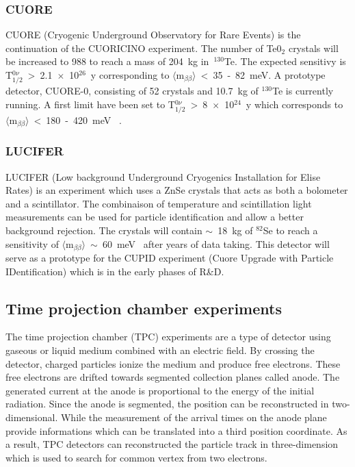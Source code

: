 \documentclass[main.tex]{subfiles}
\begin{document}
\subsubsection{CUORE}


\NI CUORE (Cryogenic Underground Observatory for Rare Events) is the continuation of the CUORICINO experiment. The number of Te0$_\text{2}$ crystals will be increased to 988 to reach a mass of 204~kg in~$^{\text{130}}$Te. The expected sensitivy is T$_{\text{1/2}}^{0\nu}$~>~2.1~$\times$~10$^{\text{26}}$~y corresponding to $\langle \text{m}_{\beta\beta} \rangle$~<~35~-~82~meV. A prototype detector, CUORE-0, consisting of 52 crystals and 10.7~kg of $^{\text{130}}$Te is currently running. A first limit have been set to T$_{\text{1/2}}^{0\nu}$~>~8~$\times$~10$^{\text{24}}$~y which corresponds to $\langle \text{m}_{\beta\beta} \rangle$~<~180~-~420~meV~\cite{CUORE} .


\subsubsection{LUCIFER}


\NI LUCIFER (Low background Underground Cryogenics Installation for Elise Rates) is an experiment which uses a ZnSe crystals that acts as both a bolometer and a scintillator. The combinaison of temperature and scintillation light measurements can be used for particle identification and allow a better background rejection. The crystals will contain $\sim$~18~kg of $^{\text{82}}$Se to reach a sensitivity of $\langle \text{m}_{\beta\beta} \rangle$~$\sim$~60~meV~\cite{LUCIFER} after years of data taking. This detector will serve as a prototype for the CUPID experiment (Cuore Upgrade with Particle IDentification) which is in the early phases of R\&D.


\subsection{Time projection chamber experiments}


\NI The time projection chamber (TPC) experiments are a type of detector using gaseous or liquid medium combined with an electric field. By crossing the detector, charged particles ionize the medium and produce free electrons. These free electrons are drifted towards segmented collection planes called anode. The generated current at the anode is proportional to the energy of the initial radiation. Since the anode is segmented, the position can be reconstructed in two-dimensional. While the measurement of the arrival times on the anode plane provide informations which can be translated into a third position coordinate. As a result, TPC detectors can reconstructed the particle track in three-dimension which is used to search for common vertex from two electrons.
\end{document}
